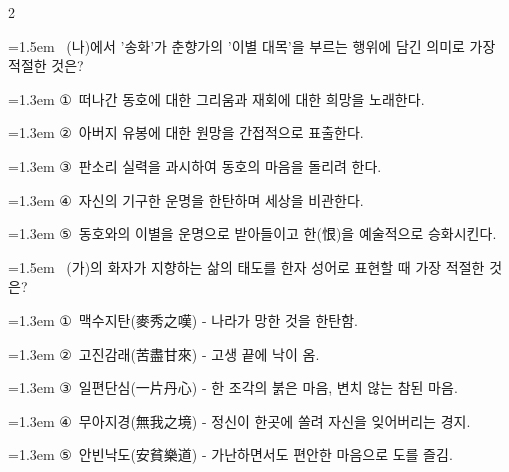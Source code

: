 \documentclass[10pt, a4paper]{article}
\begin{document}
\begin{multicols}{2}
\noindent\begin{minipage}{\columnwidth}
\vspace{2mm}
{\hangindent=1.5em  ~(나)에서 '송화'가 춘향가의 '이별 대목'을 부르는 행위에 담긴 의미로 가장 적절한 것은?\par}

\vspace{0.5mm}
{\hangindent=1.3em  \noindent\hspace{0.3em}①~떠나간 동호에 대한 그리움과 재회에 대한 희망을 노래한다.\par}
{\hangindent=1.3em  \noindent\hspace{0.3em}②~아버지 유봉에 대한 원망을 간접적으로 표출한다.\par}
{\hangindent=1.3em  \noindent\hspace{0.3em}③~판소리 실력을 과시하여 동호의 마음을 돌리려 한다.\par}
{\hangindent=1.3em  \noindent\hspace{0.3em}④~자신의 기구한 운명을 한탄하며 세상을 비관한다.\par}
{\hangindent=1.3em  \noindent\hspace{0.3em}⑤~동호와의 이별을 운명으로 받아들이고 한(恨)을 예술적으로 승화시킨다.\par}
\vspace{4mm}
\end{minipage}
\par

\noindent\begin{minipage}{\columnwidth}
\vspace{2mm}
{\hangindent=1.5em  ~(가)의 화자가 지향하는 삶의 태도를 한자 성어로 표현할 때 가장 적절한 것은?\par}

\vspace{0.5mm}
{\hangindent=1.3em  \noindent\hspace{0.3em}①~맥수지탄(麥秀之嘆) - 나라가 망한 것을 한탄함.\par}
{\hangindent=1.3em  \noindent\hspace{0.3em}②~고진감래(苦盡甘來) - 고생 끝에 낙이 옴.\par}
{\hangindent=1.3em  \noindent\hspace{0.3em}③~일편단심(一片丹心) - 한 조각의 붉은 마음, 변치 않는 참된 마음.\par}
{\hangindent=1.3em  \noindent\hspace{0.3em}④~무아지경(無我之境) - 정신이 한곳에 쏠려 자신을 잊어버리는 경지.\par}
{\hangindent=1.3em  \noindent\hspace{0.3em}⑤~안빈낙도(安貧樂道) - 가난하면서도 편안한 마음으로 도를 즐김.\par}
\vspace{4mm}
\end{minipage}
\par


\end{multicols}
\end{document}
